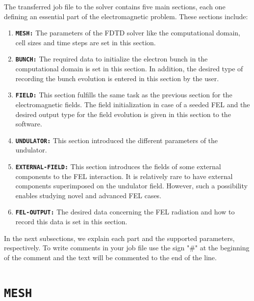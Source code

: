 The transferred job file to the solver contains five main sections, each one defining an essential part of the electromagnetic problem.
%
These sections include:
%
\begin{enumerate}
\item \textbf{\texttt{MESH:}} The parameters of the FDTD solver like the computational domain, cell sizes and time steps are set in this section.
\item \textbf{\texttt{BUNCH:}} The required data to initialize the electron bunch in the computational domain is set in this section. In addition, the desired type of recording the bunch evolution is entered in this section by the user.
\item \textbf{\texttt{FIELD:}} This section fulfills the same task as the previous section for the electromagnetic fields. The field initialization in case of a seeded FEL and the desired output type for the field evolution is given in this section to the software.
\item \textbf{\texttt{UNDULATOR:}} This section introduced the different parameters of the undulator.
\item \textbf{\texttt{EXTERNAL-FIELD:}} This section introduces the fields of some external components to the FEL interaction. It is relatively rare to have external components superimposed on the undulator field. However, such a possibility enables studying novel and advanced FEL cases.
\item \textbf{\texttt{FEL-OUTPUT:}} The desired data concerning the FEL radiation and how to record this data is set in this section.
\end{enumerate}
%
In the next subsections, we explain each part and the supported parameters, respectively.
%
To write comments in your job file use the sign "\#" at the beginning of the comment and the text will be commented to the end of the line.

\section{\texttt{MESH}}

